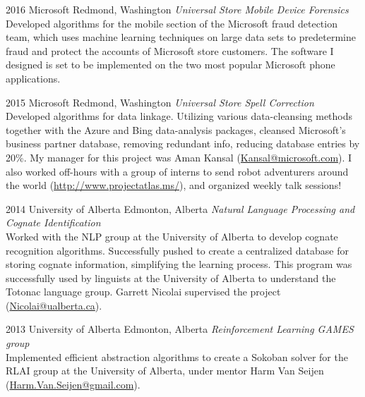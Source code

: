 \documentclass{friggeri-cv} %
\begin{document}
\begin{entrylist}


\entry
{2016}
{Microsoft}
{Redmond, Washington}
{\emph{Universal Store Mobile Device Forensics} \\
Developed algorithms for the mobile section of the Microsoft fraud detection team, which uses machine learning techniques on large data sets to predetermine fraud and protect the accounts of Microsoft store customers. The software I designed is set to be implemented on the two most popular Microsoft phone applications. }


\entry
{2015}
{Microsoft}
{Redmond, Washington}
{\emph{Universal Store Spell Correction} \\
Developed algorithms for data linkage. Utilizing various data-cleansing methods together with the Azure and Bing data-analysis packages, cleansed Microsoft's business partner database, removing redundant info, reducing database entries by 20\%. My manager for this project was Aman Kansal (\href{mailto:Kansal@microsoft.com}{Kansal@microsoft.com}). I also worked off-hours with a group of interns to send robot adventurers around the world (\href{http://www.projectatlas.ms/}{http://www.projectatlas.ms/}), and organized weekly talk sessions!}


\entry
{2014}
{University of Alberta}
{Edmonton, Alberta}
{\emph{Natural Language Processing and Cognate Identification} \\
Worked with the NLP group at the University of Alberta to develop cognate recognition algorithms. Successfully pushed to create a centralized database for storing cognate information, simplifying the learning process. This program was successfully used by linguists at the University of Alberta to understand the Totonac language group. Garrett Nicolai supervised the project (\href{mailto:Nicolai@ualberta.ca}{Nicolai@ualberta.ca}).}


\entry
{2013}
{University of Alberta}
{Edmonton, Alberta}
{\emph{Reinforcement Learning GAMES group} \\
Implemented efficient abstraction algorithms to create a Sokoban solver for the RLAI group at the University of Alberta, under mentor Harm Van Seijen (\href{mailto:Harm.Van.Seijen@gmail.com}{Harm.Van.Seijen@gmail.com}).}


\end{entrylist}
\end{document}
